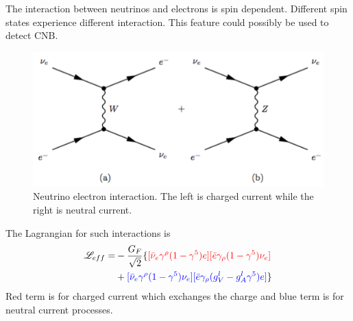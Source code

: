 \documentclass[letterpaper,12pt,english]{sphinxmanual}
\begin{document}
The interaction between neutrinos and electrons is spin dependent. Different spin states experience different interaction. This feature could possibly be used to detect CNB.
\begin{figure}[htbp]
\centering
\capstart

\includegraphics{neutrino-electron-feynman.png}
\caption{Neutrino electron interaction. The left is charged current while the right is neutral current.}\end{figure}

The Lagrangian for such interactions is
\begin{gather}
\begin{split}\mathscr{L}_{eff} =& -\frac{G_F}{\sqrt{2}} \{ {\color{red} [ \bar \nu_e \gamma^\rho (1-\gamma^5) e ] [\bar e \gamma_\rho (1-\gamma^5) \nu_e]  } \\
&+ {\color{blue} [ \bar \nu_e \gamma^\rho (1-\gamma^5) \nu_e ] [\bar e \gamma_\rho (g_V^l-g_A^l\gamma^5) e ]  } \}\end{split}\notag
\end{gather}
Red term is for charged current which exchanges the charge and blue term is for neutral current processes.
\end{document}
